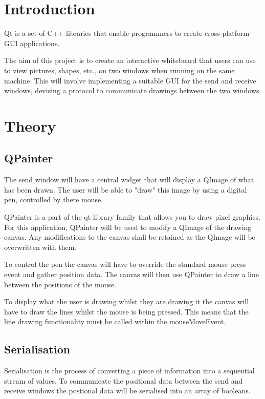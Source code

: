 \documentclass[10pt]{article}
\begin{document}
\begin{multicols*}{2}

\section{Introduction}
Qt is a set of C++ libraries that enable programmers to create cross-platform GUI applications.

The aim of this project is to create an interactive whiteboard that users can use to view pictures, shapes, etc., on two windows when running on the same machine. This will involve implementing a suitable GUI for the send and receive windows, devising a protocol to communicate drawings between the two windows.

\section{Theory}
\subsection{QPainter}
The send window will have a central widget that will display a QImage of what has been drawn. The user will be able to "draw" this image by using a digital pen, controlled by there mouse.

QPainter is a part of the qt library family that allows you to draw pixel graphics. For this application, QPainter will be used to modify a QImage of the drawing canvas. Any modifications to the canvas shall be retained as the QImage will be overwritten with them.

To control the pen the canvas will have to override the standard mouse press event and gather position data. The canvas will then use QPainter to draw a line between the positions of the mouse. 

To display what the user is drawing whilst they are drawing it the canvas will have to draw the lines whilst the mouse is being pressed. This means that the line drawing functionality must be called within the mouseMoveEvent.

\subsection{Serialisation}
Serialisation is the process of converting a piece of information into a sequential stream of values. To communicate the positional data between the send and receive windows the postional data will be serialised into an array of booleans.


\end{multicols*}
\end{document}
